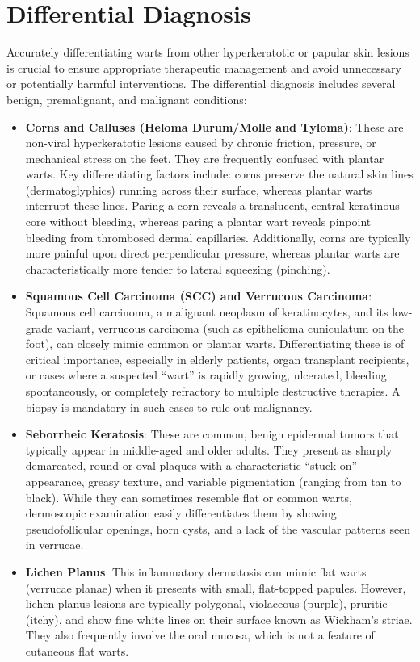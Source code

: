 \section*{Differential Diagnosis}
Accurately differentiating warts from other hyperkeratotic or papular skin lesions is crucial to ensure appropriate therapeutic management and avoid unnecessary or potentially harmful interventions. The differential diagnosis includes several benign, premalignant, and malignant conditions:
\begin{itemize}
    \item \textbf{Corns and Calluses (Heloma Durum/Molle and Tyloma)}: These are non-viral hyperkeratotic lesions caused by chronic friction, pressure, or mechanical stress on the feet. They are frequently confused with plantar warts. Key differentiating factors include: corns preserve the natural skin lines (dermatoglyphics) running across their surface, whereas plantar warts interrupt these lines. Paring a corn reveals a translucent, central keratinous core without bleeding, whereas paring a plantar wart reveals pinpoint bleeding from thrombosed dermal capillaries. Additionally, corns are typically more painful upon direct perpendicular pressure, whereas plantar warts are characteristically more tender to lateral squeezing (pinching).
    \item \textbf{Squamous Cell Carcinoma (SCC) and Verrucous Carcinoma}: Squamous cell carcinoma, a malignant neoplasm of keratinocytes, and its low-grade variant, verrucous carcinoma (such as epithelioma cuniculatum on the foot), can closely mimic common or plantar warts. Differentiating these is of critical importance, especially in elderly patients, organ transplant recipients, or cases where a suspected ``wart'' is rapidly growing, ulcerated, bleeding spontaneously, or completely refractory to multiple destructive therapies. A biopsy is mandatory in such cases to rule out malignancy.
    \item \textbf{Seborrheic Keratosis}: These are common, benign epidermal tumors that typically appear in middle-aged and older adults. They present as sharply demarcated, round or oval plaques with a characteristic ``stuck-on'' appearance, greasy texture, and variable pigmentation (ranging from tan to black). While they can sometimes resemble flat or common warts, dermoscopic examination easily differentiates them by showing pseudofollicular openings, horn cysts, and a lack of the vascular patterns seen in verrucae.
    \item \textbf{Lichen Planus}: This inflammatory dermatosis can mimic flat warts (verrucae planae) when it presents with small, flat-topped papules. However, lichen planus lesions are typically polygonal, violaceous (purple), pruritic (itchy), and show fine white lines on their surface known as Wickham's striae. They also frequently involve the oral mucosa, which is not a feature of cutaneous flat warts.

\end{itemize}
